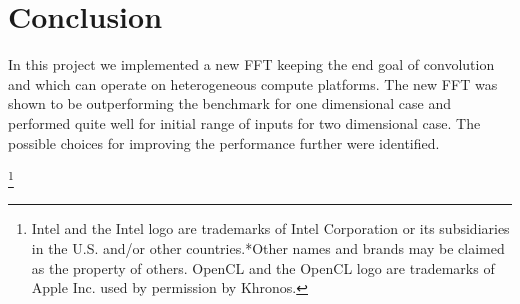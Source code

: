 \documentclass[sigconf]{acmart}
\begin{document}
\section{Conclusion}
In this project we implemented a new FFT keeping the end goal of convolution and which can operate on heterogeneous compute platforms. The new FFT was shown to be outperforming the benchmark for one dimensional case and performed quite well for initial range of inputs for two dimensional case. The possible choices for improving the performance further were identified.


\let\thefootnote\relax\footnote{Intel and the Intel logo are trademarks of Intel Corporation or its subsidiaries in the U.S. and/or other countries.*Other names and brands may be claimed as the property of others. OpenCL and the OpenCL logo are trademarks of Apple Inc. used by permission by Khronos.}  
	

 
\end{document}
